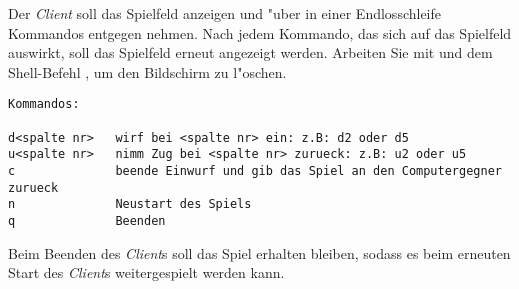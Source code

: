 Der \emph{Client} soll das Spielfeld anzeigen und "uber  in einer Endlosschleife Kommandos entgegen nehmen. Nach jedem Kommando, das sich auf das Spielfeld auswirkt, soll das Spielfeld erneut angezeigt werden. Arbeiten Sie mit  und dem Shell-Befehl , um den Bildschirm zu l"oschen.
\begin{verbatim}
Kommandos:

d<spalte nr>   wirf bei <spalte nr> ein: z.B: d2 oder d5
u<spalte nr>   nimm Zug bei <spalte nr> zurueck: z.B: u2 oder u5
c              beende Einwurf und gib das Spiel an den Computergegner zurueck
n              Neustart des Spiels
q              Beenden
\end{verbatim}

Beim Beenden des \emph{Client}s soll das Spiel erhalten bleiben, sodass es beim erneuten Start des \emph{Client}s weitergespielt werden kann.

\osueguidelinesthree


